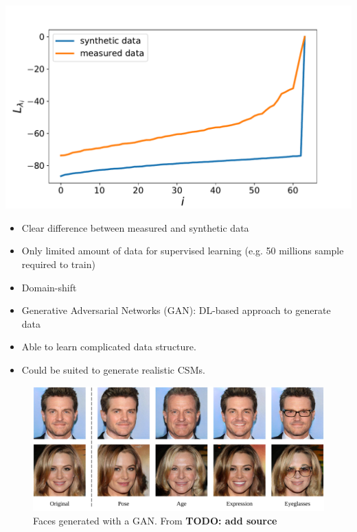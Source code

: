 \documentclass[12pt,pdftex,16x10]{elpres} %
\begin{document}
\begin{psli}
  \begin{minipage}[b][0.7\textheight][t]{0.5\textwidth}
    \centering
    \includegraphics[width=1.1\textwidth]{figs/comparison_synthetic_measurement_data.pdf}
  \end{minipage}
  \begin{minipage}[b][0.7\textheight][t]{0.5\textwidth}
    \begin{itemize}
      \item Clear difference between measured and synthetic data
      \item Only limited amount of data for supervised learning (e.g. 50 millions sample required to train)
      \item Domain-shift
    \end{itemize}
  \end{minipage}
\end{psli}

\begin{psli}
  
  \begin{itemize}
    \item Generative Adversarial Networks (GAN): DL-based approach to generate data
    \item Able to learn complicated data structure.
    \item Could be suited to generate realistic CSMs.
  \end{itemize}


  \begin{figure}[h]
    \centering
    \includegraphics[width=.5\textwidth]{figs/GAN_illustration.jpg}
    \caption{Faces generated with a GAN. From \textbf{TODO: add source}}
  \end{figure}
  
\end{psli}
\end{document}
